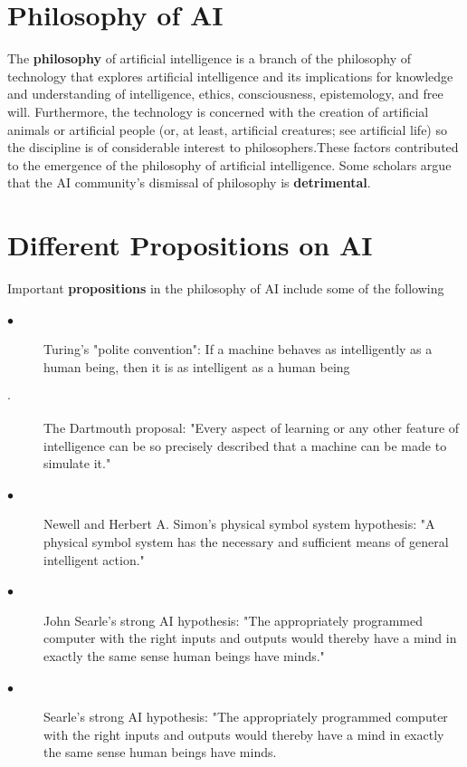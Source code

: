 \documentclass[12pt]{article}
\begin{document}





\section{Philosophy of AI}
\small The \textbf{philosophy} of artificial intelligence is a branch of the philosophy of technology that explores artificial intelligence and its implications for knowledge and understanding of intelligence, ethics, consciousness, epistemology, and free will. Furthermore, the technology is concerned with the creation of artificial animals or artificial people (or, at least, artificial creatures; see artificial life) so the discipline is of considerable interest to philosophers.These factors contributed to the emergence of the philosophy of artificial intelligence. Some scholars argue that the AI community's dismissal of philosophy is \textbf{detrimental}.
\section{Different Propositions on AI}
\small Important \textbf{propositions} in the philosophy of AI include some of the following
\begin{description}
\item[$\bullet$] Turing's "polite convention": If a machine behaves as intelligently as a human being, then it is as intelligent as a human being
\item[$\cdot$] The Dartmouth proposal: "Every aspect of learning or any other feature of intelligence can be so precisely described that a machine can be made to simulate it."
\item[$\bullet$] Newell and Herbert A. Simon's physical symbol system hypothesis: "A physical symbol system has the necessary and sufficient means of general intelligent action."
\item[$\bullet$] John Searle's strong AI hypothesis: "The appropriately programmed computer with the right inputs and outputs would thereby have a mind in exactly the same sense human beings have minds."
\item[$\bullet$] Searle's strong AI hypothesis: "The appropriately programmed computer with the right inputs and outputs would thereby have a mind in exactly the same sense human beings have minds.
\end{description}
\end{document}

